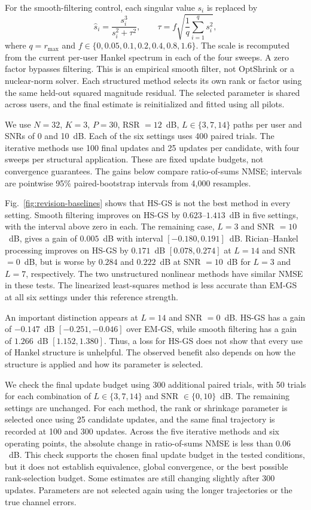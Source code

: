 \documentclass[journal]{IEEEtran}
\begin{document}
For the smooth-filtering control, each singular value $s_i$ is replaced by
\begin{equation}
\widehat s_i=\frac{s_i^3}{s_i^2+\tau^2},
\qquad
\tau=f\sqrt{\frac{1}{q}\sum_{i=1}^{q}s_i^2},
\end{equation}
where $q=r_{\max}$ and
$f\in\{0,0.05,0.1,0.2,0.4,0.8,1.6\}$.
The scale is recomputed from the current per-user Hankel spectrum in each
of the four sweeps. A zero factor bypasses filtering. This is an empirical
smooth filter, not OptShrink or a nuclear-norm solver. Each structured
method selects its own rank or factor using the same held-out squared
magnitude residual. The selected parameter is shared across users, and
the final estimate is reinitialized and fitted using all pilots.

We use $N=32$, $K=3$, $P=30$, RSR $=12$~dB,
$L\in\{3,7,14\}$ paths per user and SNRs of 0 and 10~dB. Each of the
six settings uses 400 paired trials. The iterative methods use 100 final
updates and 25 updates per candidate, with four sweeps per structural
application. These are fixed update budgets, not convergence guarantees.
The gains below compare ratio-of-sums NMSE; intervals are pointwise 95\%
paired-bootstrap intervals from 4,000 resamples.

Fig.~\ref{fig:revision-baselines} shows that HS-GS is not the best method
in every setting. Smooth filtering improves on HS-GS by
$0.623$--$1.413$~dB in five settings, with the interval above zero in each.
The remaining case, $L=3$ and SNR $=10$~dB, gives a gain of
$0.005$~dB with interval $[-0.180,0.191]$~dB.
Rician--Hankel processing improves on HS-GS by $0.171$~dB
$[0.078,0.274]$ at $L=14$ and SNR $=0$~dB, but is worse by
$0.284$ and $0.222$~dB at SNR $=10$~dB for $L=3$ and $L=7$,
respectively. The two unstructured nonlinear methods have similar NMSE
in these tests. The linearized least-squares method is less accurate than
EM-GS at all six settings under this reference strength.

An important distinction appears at $L=14$ and SNR $=0$~dB. HS-GS has
a gain of $-0.147$~dB $[-0.251,-0.046]$ over EM-GS, while smooth
filtering has a gain of $1.266$~dB $[1.152,1.380]$. Thus, a loss for
HS-GS does not show that every use of Hankel structure is unhelpful. The
observed benefit also depends on how the structure is applied and how its
parameter is selected.

We check the final update budget using 300 additional paired trials,
with 50 trials for each combination of $L\in\{3,7,14\}$ and
SNR $\in\{0,10\}$~dB. The remaining settings are unchanged. For each
method, the rank or shrinkage parameter is selected once using 25
candidate updates, and the same final trajectory is recorded at 100 and
300 updates. Across the five iterative methods and six operating points,
the absolute change in ratio-of-sums NMSE is less than $0.06$~dB.
This check supports the chosen final update budget in the tested
conditions, but it does not establish equivalence, global convergence, or
the best possible rank-selection budget. Some estimates are still changing
slightly after 300 updates. Parameters are not selected again using the
longer trajectories or the true channel errors.
\end{document}
